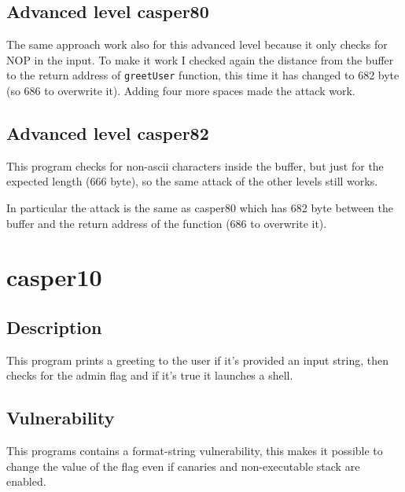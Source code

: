 \documentclass[a4paper,12pt]{article}
\begin{document}
\subsection{Advanced level casper80}

The same approach work also for this advanced level because it only checks for NOP in the input. To make it work I checked again the distance from the buffer to the return address of \texttt{greetUser} function, this time it has changed to 682 byte (so 686 to overwrite it). Adding four more spaces made the attack work.



\subsection{Advanced level casper82}

This program checks for non-ascii characters inside the buffer, but just for the expected length (666 byte), so the same attack of the other levels still works.

In particular the attack is the same as casper80 which has 682 byte between the buffer and the return address of the function (686 to overwrite it).


\section{casper10}

\subsection{Description}
This program prints a greeting to the user if it's provided an input string, then checks for the admin flag and if it's true it launches a shell. 



\subsection{Vulnerability}

This programs contains a format-string vulnerability, this makes it possible to change the value of the flag even if canaries and non-executable stack are enabled.
\end{document}
